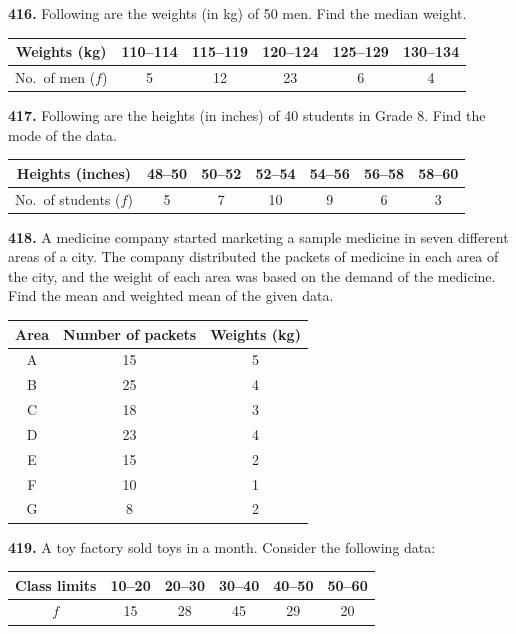 \documentclass[11pt]{article}
\begin{document}
\bigskip
\noindent\textbf{416.} Following are the weights (in kg) of 50 men. Find the median weight.

\begin{center}
\begin{tabular}{|c|c|c|c|c|c|}
\hline
Weights (kg) & 110--114 & 115--119 & 120--124 & 125--129 & 130--134 \\
\hline
No.\ of men ($f$) & 5 & 12 & 23 & 6 & 4 \\
\hline
\end{tabular}
\end{center}

\bigskip
\noindent\textbf{417.} Following are the heights (in inches) of 40 students in Grade 8. Find the mode of the data.

\begin{center}
\begin{tabular}{|c|c|c|c|c|c|c|}
\hline
Heights (inches) & 48--50 & 50--52 & 52--54 & 54--56 & 56--58 & 58--60 \\
\hline
No.\ of students ($f$) & 5 & 7 & 10 & 9 & 6 & 3 \\
\hline
\end{tabular}
\end{center}

\bigskip
\noindent\textbf{418.} A medicine company started marketing a sample medicine in seven different areas of a city. The company distributed the packets of medicine in each area of the city, and the weight of each area was based on the demand of the medicine. Find the mean and weighted mean of the given data.

\begin{center}
\begin{tabular}{|c|c|c|}
\hline
Area & Number of packets & Weights (kg) \\
\hline
A & 15 & 5 \\
B & 25 & 4 \\
C & 18 & 3 \\
D & 23 & 4 \\
E & 15 & 2 \\
F & 10 & 1 \\
G & 8  & 2 \\
\hline
\end{tabular}
\end{center}

\bigskip
\noindent\textbf{419.} A toy factory sold toys in a month. Consider the following data:

\begin{center}
\begin{tabular}{|c|c|c|c|c|c|}
\hline
Class limits & 10--20 & 20--30 & 30--40 & 40--50 & 50--60 \\
\hline
$f$ & 15 & 28 & 45 & 29 & 20 \\
\hline
\end{tabular}
\end{center}
\end{document}
